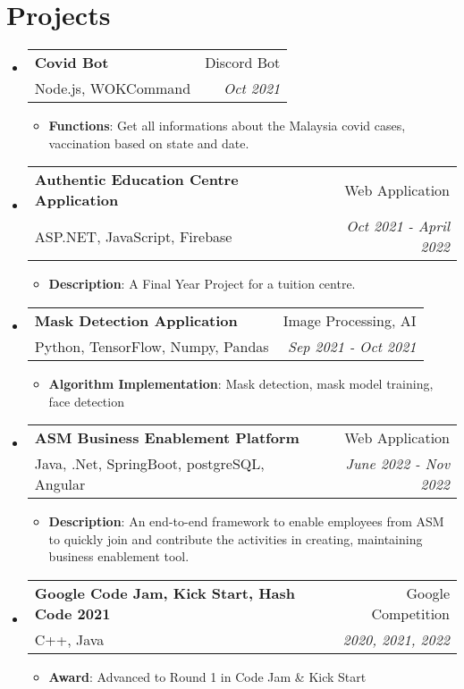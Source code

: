 \documentclass[a4paper, 12pt]{article}
\makeatletter
\newcommand{\resumeItem}[2]{
  \item\small{
    \textbf{\textsf{#1}}{: \textsf{#2} \vspace{-2pt}}
  }
}
\newcommand{\resumeSubheading}[4]{
  \vspace{-1pt}\item
    \begin{tabular*}{0.97\textwidth}[t]{l@{\extracolsep{\fill}}r}
      \textbf{\textsf{#1}} & \textsf{#2} \\
      \textsf{\small{#3}} & \textit{\textsf{\small{#4}}} \\
    \end{tabular*}\vspace{-5pt}
}
\newcommand{\resumeSubHeadingListStart}{\begin{itemize}[leftmargin=*]}
\newcommand{\resumeSubHeadingListEnd}{\end{itemize}}
\newcommand{\resumeItemListStart}{\begin{itemize}}
\newcommand{\resumeItemListEnd}{\end{itemize}\vspace{-5pt}}
\makeatother
\begin{document}
\vspace{0pt}
\section{Projects}
    \resumeSubHeadingListStart
        \resumeSubheading
        {Covid Bot}{Discord Bot}
        {Node.js, WOKCommand}{Oct 2021}
            \resumeItemListStart
                \resumeItem{Functions}
                {Get all informations about the Malaysia covid cases, vaccination based on state and date.}
            \resumeItemListEnd
    
    \vspace{5px}
    \resumeSubheading
        {Authentic Education Centre Application}{Web Application}
        {ASP.NET, JavaScript, Firebase}{Oct 2021 - April 2022}
            \resumeItemListStart
                \resumeItem{Description}
                {A Final Year Project for a tuition centre.}
            \resumeItemListEnd

    \vspace{5px}
    \resumeSubheading
        {Mask Detection Application}{Image Processing, AI}
        {Python, TensorFlow, Numpy, Pandas}{Sep 2021 - Oct 2021}
            \resumeItemListStart
                \resumeItem{Algorithm Implementation}
                {Mask detection, mask model training, face detection}
            \resumeItemListEnd
            
    \vspace{5px}
    \resumeSubheading
        {ASM Business Enablement Platform}{Web Application}
        {Java, .Net, SpringBoot, postgreSQL, Angular}{June 2022 - Nov 2022}
            \resumeItemListStart
                \resumeItem{Description}
                {An end-to-end framework to enable employees from ASM to quickly join and contribute the activities in creating, maintaining business enablement tool.}
            \resumeItemListEnd
            
    \vspace{5px}
    \resumeSubheading
        {Google Code Jam, Kick Start, Hash Code 2021}{Google Competition}
        {C++, Java}{2020, 2021, 2022}
            \resumeItemListStart
                \resumeItem{Award}
                {Advanced to Round 1 in Code Jam \& Kick Start}
            \resumeItemListEnd
            
    \vspace{5px}
\resumeSubHeadingListEnd

\vspace{-5pt}
\end{document}
